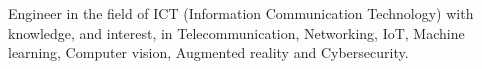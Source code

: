 %
%
%
\par{
Engineer in the field of ICT (Information Communication Technology) with knowledge, and interest, in Telecommunication, Networking, IoT, Machine learning, Computer vision, Augmented reality and Cybersecurity.
}
